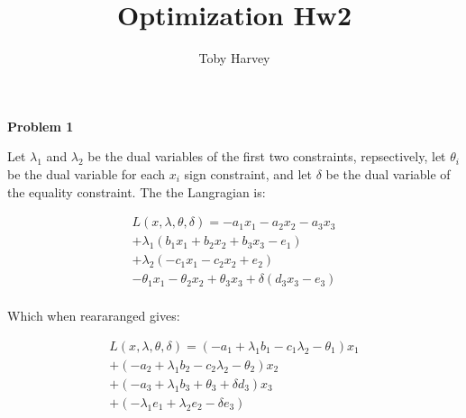 \documentclass{article}
\begin{document}
\title{Optimization Hw2}
\author{Toby Harvey}
\maketitle
\noindent\textbf{Problem 1}

\vspace{5mm}

\noindent Let $\lambda_1$ and $\lambda_2$ be the dual variables of the first two constraints, repsectively, let $\theta_i$ be the dual variable for each $x_i$ sign constraint, and let $\delta$ be the dual variable of the equality constraint. The the Langragian is:

\begin{gather*}
  L(x,\lambda,\theta,\delta) = -a_1x_1 -a_2x_2 -a_3x_3\\
  + \lambda_1(b_1x_1 + b_2x_2 + b_3x_3 - e_1) \\
  + \lambda_2(-c_1x_1 - c_2x_2 + e_2) \\ 
  - \theta_1 x_1 - \theta_2 x_2 + \theta_3 x_3 + \delta(d_3x_3 - e_3) \\
\end{gather*}

Which when reararanged gives:

\begin{gather*}
   L(x,\lambda,\theta,\delta) = (-a_1 + \lambda_1b_1 - c_1\lambda_2 - \theta_1) x_1 \\
  + (-a_2 +\lambda_1b_2 - c_2\lambda_2 - \theta_2) x_2 \\
  + (-a_3 + \lambda_1b_3 + \theta_3 + \delta d_3) x_3 \\
  + (-\lambda_1e_1 + \lambda_2e_2 - \delta e_3) \\
\end{gather*}
  
\end{document}
